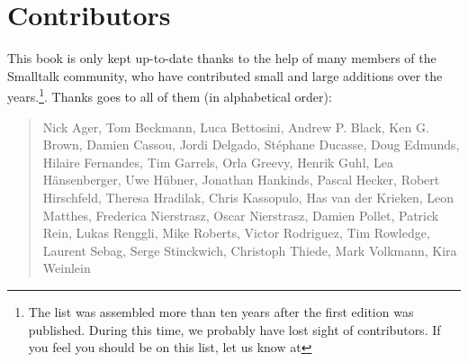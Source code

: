 \chapter*{Contributors}
This book is only kept up-to-date thanks to the help of many members of the Smalltalk community, who have contributed small and large additions over the years.\footnote{The list was assembled more than ten years after the first edition was published. During this time, we probably have lost sight of contributors. If you feel you should be on this list, let us know at \sbeRepoUrl}. Thanks goes to all of them (in alphabetical order):


\begin{quotation}
Nick Ager, Tom Beckmann, Luca Bettosini, Andrew P. Black, Ken G. Brown, Damien Cassou, Jordi Delgado, St\'ephane Ducasse, Doug Edmunds, Hilaire Fernandes, Tim Garrels, Orla Greevy, Henrik Guhl, Lea H\"ansenberger, Uwe H\"ubner, Jonathan Hankinds, Pascal Hecker, Robert Hirschfeld, Theresa Hradilak, Chris Kassopulo, Has van der Krieken, Leon Matthes, Frederica Nierstrasz, Oscar Nierstrasz, Damien Pollet, Patrick Rein, Lukas Renggli, Mike Roberts, Victor Rodriguez, Tim Rowledge, Laurent Sebag, Serge Stinckwich, Christoph Thiede, Mark Volkmann, Kira Weinlein
\end{quotation}

%
%
%
%
%
